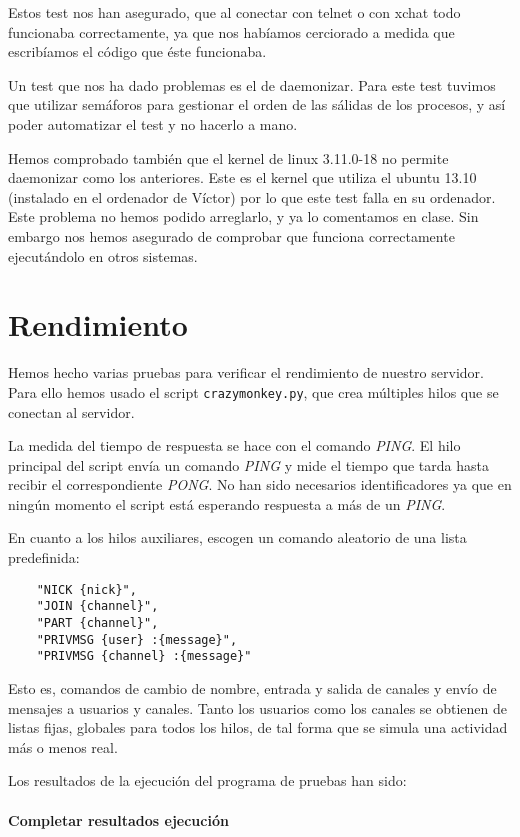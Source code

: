 \documentclass[nochap]{apuntes}
\begin{document}
Estos test nos han asegurado, que al conectar con telnet o con xchat todo funcionaba correctamente, ya que nos habíamos cerciorado a medida que escribíamos el código que éste funcionaba.

Un test que nos ha dado problemas es el de daemonizar. Para este test tuvimos que utilizar semáforos para gestionar el orden de las sálidas de los procesos, y así poder automatizar el test y no hacerlo a mano.

Hemos comprobado también que el kernel de linux 3.11.0-18 no permite daemonizar como los anteriores. Este es el kernel que utiliza el ubuntu 13.10 (instalado en el ordenador de Víctor) por lo que este test falla en su ordenador. Este problema no hemos podido arreglarlo, y ya lo comentamos en clase. Sin embargo nos hemos asegurado de comprobar que funciona correctamente ejecutándolo en otros sistemas.

\section{Rendimiento}

Hemos hecho varias pruebas para verificar el rendimiento de nuestro servidor. Para ello hemos usado el script \texttt{crazymonkey.py}, que crea múltiples hilos que se conectan al servidor. 

La medida del tiempo de respuesta se hace con el comando \textit{PING}. El hilo principal del script envía un comando \textit{PING} y mide el tiempo que tarda hasta recibir el correspondiente \textit{PONG}. No han sido necesarios identificadores ya que en ningún momento el script está esperando respuesta a más de un \textit{PING}.

En cuanto a los hilos auxiliares, escogen un comando aleatorio de una lista predefinida:

\begin{verbatim}
	"NICK {nick}",
	"JOIN {channel}",
	"PART {channel}",
	"PRIVMSG {user} :{message}",
	"PRIVMSG {channel} :{message}"
\end{verbatim}

Esto es, comandos de cambio de nombre, entrada y salida de canales y envío de mensajes a usuarios y canales. Tanto los usuarios como los canales se obtienen de listas fijas, globales para todos los hilos, de tal forma que se simula una actividad más o menos real.

Los resultados de la ejecución del programa de pruebas han sido:

\paragraph{Completar resultados ejecución}
\end{document}
